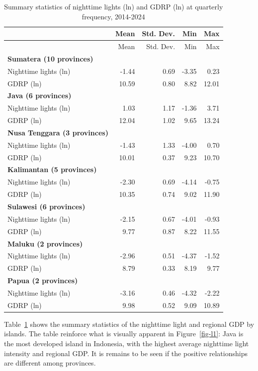 \documentclass[
  manuscript=article,
  layout=publish,
  year=2026,
  volume=3,
]{den}
\begin{document}
\begin{longtable}[]{@{}lrrrr@{}}
\caption{Summary statistics of nighttime lights (ln) and GDRP (ln) at
quarterly frequency, 2014-2024}\label{tbl-sumstat}\tabularnewline
\toprule\noalign{}
& Mean & Std. Dev. & Min & Max \\
\midrule\noalign{}
\endfirsthead
\toprule\noalign{}
& Mean & Std. Dev. & Min & Max \\
\midrule\noalign{}
\endhead
\bottomrule\noalign{}
\endlastfoot
\textbf{Sumatera (10 provinces)} & & & & \\
Nighttime lights (ln) & -1.44 & 0.69 & -3.35 & 0.23 \\
GDRP (ln) & 10.59 & 0.80 & 8.82 & 12.01 \\
\textbf{Java (6 provinces)} & & & & \\
Nighttime lights (ln) & 1.03 & 1.17 & -1.36 & 3.71 \\
GDRP (ln) & 12.04 & 1.02 & 9.65 & 13.24 \\
\textbf{Nusa Tenggara (3 provinces)} & & & & \\
Nighttime lights (ln) & -1.43 & 1.33 & -4.00 & 0.70 \\
GDRP (ln) & 10.01 & 0.37 & 9.23 & 10.70 \\
\textbf{Kalimantan (5 provinces)} & & & & \\
Nighttime lights (ln) & -2.30 & 0.69 & -4.14 & -0.75 \\
GDRP (ln) & 10.35 & 0.74 & 9.02 & 11.90 \\
\textbf{Sulawesi (6 provinces)} & & & & \\
Nighttime lights (ln) & -2.15 & 0.67 & -4.01 & -0.93 \\
GDRP (ln) & 9.77 & 0.87 & 8.22 & 11.55 \\
\textbf{Maluku (2 provinces)} & & & & \\
Nighttime lights (ln) & -2.96 & 0.51 & -4.37 & -1.52 \\
GDRP (ln) & 8.79 & 0.33 & 8.19 & 9.77 \\
\textbf{Papua (2 provinces)} & & & & \\
Nighttime lights (ln) & -3.16 & 0.46 & -4.32 & -2.22 \\
GDRP (ln) & 9.98 & 0.52 & 9.09 & 10.89 \\
\end{longtable}

Table~\ref{tbl-sumstat} shows the summary statistics of the nighttime
light and regional GDP by islands. The table reinforce what is visually
apparent in Figure~\ref{fig-l1}: Java is the most developed island in
Indonesia, with the highest average nighttime light intensity and
regional GDP. It is remains to be seen if the positive relationships are
different among provinces.
\end{document}
